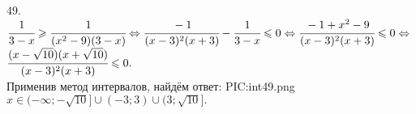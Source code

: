 49. $\cfrac{1}{3-x}\geqslant\cfrac{1}{(x^2-9)(3-x)}\Leftrightarrow\cfrac{-1}{(x-3)^2(x+3)}-\cfrac{1}{3-x}\leqslant0\Leftrightarrow
\cfrac{-1+x^2-9}{(x-3)^2(x+3)}\leqslant0\Leftrightarrow$\\$\cfrac{(x-\sqrt{10})(x+\sqrt{10})}{(x-3)^2(x+3)}\leqslant0.$\\ Применив метод интервалов, найдём ответ:
{{PIC:int49.png}}
$x\in(-\infty;-\sqrt{10}]\cup(-3;3)\cup(3;\sqrt{10}].$\\
